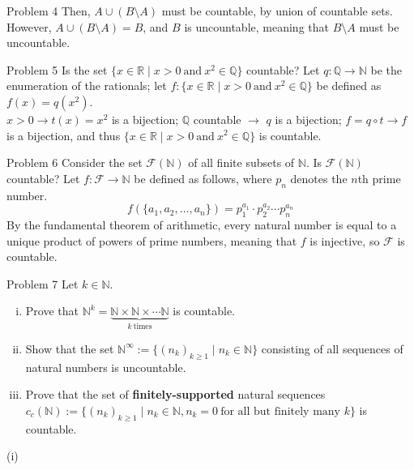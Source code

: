 \documentclass[10pt]{extarticle}
\begin{document}
{\begin{problem}{Problem 4}
    Then, $A\cup (B\setminus A)$ must be countable, by union of countable sets.\\

    However, $A\cup (B\setminus A) = B$, and $B$ is uncountable, meaning that $B\setminus A$ must be uncountable.
  \end{problem}
  \begin{problem}{Problem 5}
    Is the set $\{x\in\mathbb{R} \mid x>0~\textrm{and}~x^2\in\mathbb{Q}\}$ countable?
    \tcblower
    Let $q: \mathbb{Q} \rightarrow \mathbb{N}$ be the enumeration of the rationals; let $f:\{x\in\mathbb{R} \mid x>0~\textrm{and}~x^2\in\mathbb{Q}\}$ be defined as $f(x) = q\left(x^2\right)$.\\

    $x>0 \longrightarrow t(x) = x^2$ is a bijection; $\mathbb{Q}$ countable $\longrightarrow$ $q$ is a bijection; $f = q\circ t \longrightarrow f$ is a bijection, and thus $\{x\in\mathbb{R}\mid x>0~\textrm{and}~x^2\in\mathbb{Q}\}$ is countable.
  \end{problem}
  \begin{problem}{Problem 6}
    Consider the set $\mathcal{F}(\mathbb{N})$ of all finite subsets of $\mathbb{N}$. Is $\mathcal{F}(\mathbb{N})$ countable?
    \tcblower
    Let $f: \mathcal{F} \rightarrow \mathbb{N}$ be defined as follows, where $p_n$ denotes the $n$th prime number.
    \[
      f(\{a_1,a_2,\dots,a_n\}) = p_1^{a_1}\cdot p_2^{a_2}\cdots p_{n}^{a_n}
    \] 
    By the fundamental theorem of arithmetic, every natural number is equal to a unique product of powers of prime numbers, meaning that $f$ is injective, so $\mathcal{F}$ is countable.
  \end{problem}
  \begin{problem}{Problem 7}
    Let $k\in\mathbb{N}$.
    \begin{enumerate}[(i)]
      \item Prove that $\mathbb{N}^k = \underbrace{\mathbb{N}\times\mathbb{N}\times\cdots\mathbb{N}}_{k~\textrm{times}}$ is countable.
      \item Show that the set $\mathbb{N}^{\infty} := \{(n_k)_{k\geq 1}\mid n_k\in \mathbb{N}\}$ consisting of all sequences of natural numbers is uncountable.
      \item Prove that the set of \textbf{finitely-supported} natural sequences $c_c(\mathbb{N}) := \{(n_k)_{k\geq 1} \mid n_k\in\mathbb{N}, n_k=0~\text{for all but finitely many }k\}$ is countable.
    \end{enumerate}
    \tcblower
    \begin{problem}{(i)}

\end{problem}
\end{problem}}
\end{document}
